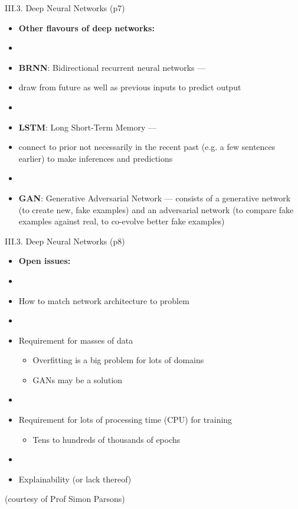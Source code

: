\documentclass[handout]{beamer}
\newcommand{\strong}[1]{\textbf{\color{teal} #1}}
\begin{document}
\begin{frame}{III.3. Deep Neural Networks (p7)}
\begin{itemize}
\item[] \textbf{Other flavours of deep networks:}
\item[]
\item \strong{BRNN}: Bidirectional recurrent neural networks ---
\item[] draw from future as well as previous inputs to predict output
\item[]
\item \strong{LSTM}: Long Short-Term Memory ---
\item[] connect to prior not necessarily in the recent past (e.g. a few sentences earlier) to make inferences and predictions
\item[]
\item \strong{GAN}: Generative Adversarial Network ---
consists of a generative network (to create new, fake examples) and an adversarial network (to compare fake examples against real, to co-evolve better fake examples)
\end{itemize}
\end{frame}
\begin{frame}{III.3. Deep Neural Networks (p8)}
\begin{itemize}
\item[] \textbf{Open issues:}
\item[]
\item How to match network architecture to problem
\item[]
\item Requirement for masses of data
	\begin{itemize}
	\item Overfitting is a big problem for lots of domains
    \item GANs may be a solution
	\end{itemize}
\item[]
\item Requirement for lots of processing time (CPU) for training
	\begin{itemize}
	\item Tens to hundreds of thousands of epochs
    \end{itemize}
\item[]
\item Explainability (or lack thereof)
\end{itemize}
\begin{center}
{\footnotesize (courtesy of Prof Simon Parsons)}
\end{center}
\end{frame}
\end{document}
